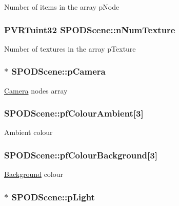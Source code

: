 Number of items in the array p\+Node \hypertarget{struct_s_p_o_d_scene_a1d46d56b22c0033b1e212f9dd2f529d9}{
\subsubsection[{n\+Num\+Texture}]{\setlength{\rightskip}{0pt plus 5cm}P\+V\+R\+Tuint32 S\+P\+O\+D\+Scene\+::n\+Num\+Texture}}\label{struct_s_p_o_d_scene_a1d46d56b22c0033b1e212f9dd2f529d9}
Number of textures in the array p\+Texture \hypertarget{struct_s_p_o_d_scene_a90c0c8d37cb1cd44a5e7ac6be0b2854b}{
\subsubsection[{p\+Camera}]{$\ast$ S\+P\+O\+D\+Scene\+::p\+Camera}}\label{struct_s_p_o_d_scene_a90c0c8d37cb1cd44a5e7ac6be0b2854b}
\hyperlink{class_camera}{Camera} nodes array \hypertarget{struct_s_p_o_d_scene_a7f984cbf6de8f86351f7fd8fa428183d}{
\subsubsection[{pf\+Colour\+Ambient}]{ S\+P\+O\+D\+Scene\+::pf\+Colour\+Ambient\mbox{[}3\mbox{]}}}\label{struct_s_p_o_d_scene_a7f984cbf6de8f86351f7fd8fa428183d}
Ambient colour \hypertarget{struct_s_p_o_d_scene_addc6ec3a2b915a5bb9ade25a90d26e0d}{
\subsubsection[{pf\+Colour\+Background}]{ S\+P\+O\+D\+Scene\+::pf\+Colour\+Background\mbox{[}3\mbox{]}}}\label{struct_s_p_o_d_scene_addc6ec3a2b915a5bb9ade25a90d26e0d}
\hyperlink{struct_background}{Background} colour \hypertarget{struct_s_p_o_d_scene_a75f48db326cc4c5e4b99f6be32078f58}{
\subsubsection[{p\+Light}]{$\ast$ S\+P\+O\+D\+Scene\+::p\+Light}}\label{struct_s_p_o_d_scene_a75f48db326cc4c5e4b99f6be32078f58}
